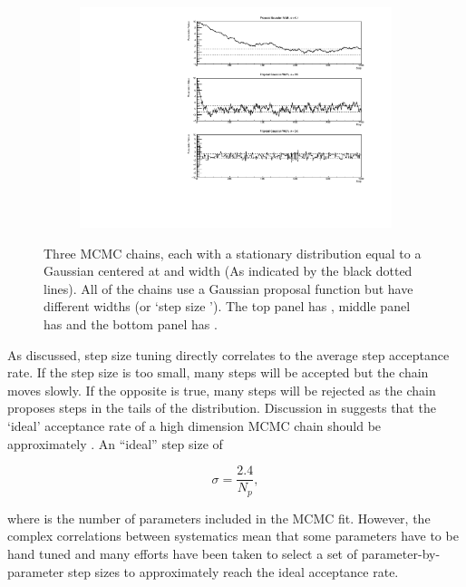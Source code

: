 \begin{figure}[h]
  \begin{subfigure}[t]{\textwidth}
    \includegraphics[width=\textwidth, trim={10mm 0mm 18mm 0mm}, clip,page=1]{Figures/MCMC/MCMCTechnique_StepSizes.pdf}
  \end{subfigure}
  \caption{Three MCMC chains, each with a stationary distribution equal to a Gaussian centered at  and width  (As indicated by the black dotted lines). All of the chains use a Gaussian proposal function but have different widths (or `step size \quickmath{\sigma}'). The top panel has , middle panel has  and the bottom panel has .}
  \label{fig:MCMC_MCTechniqueStepSizeStudy}
\end{figure}

As discussed, step size tuning directly correlates to the average step acceptance rate. If the step size is too small, many steps will be accepted but the chain moves slowly. If the opposite is true, many steps will be rejected as the chain proposes steps in the tails of the distribution. Discussion in \cite{Dunkley2005-xz} suggests that the `ideal' acceptance rate of a high dimension MCMC chain should be approximately . An ``ideal'' step size \cite{Dunkley2005-xz} of

\begin{equation}
  \label{eq:MCMC_IdealStepSize}
  \sigma = \frac{2.4}{N_{p}},
\end{equation}

where  is the number of parameters included in the MCMC fit. However, the complex correlations between systematics mean that some parameters have to be hand tuned and many efforts have been taken to select a set of parameter-by-parameter step sizes to approximately reach the ideal acceptance rate.

